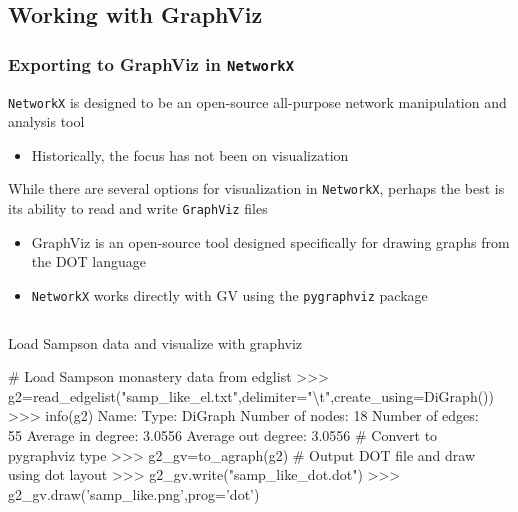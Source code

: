 \documentclass[xcolor=dvipsnames, 9pt]{beamer}
\newenvironment{code}{\begin{semiverbatim} \begin{footnotesize}}
{\end{footnotesize}\end{semiverbatim}}
\begin{document}
\subsection{Working with GraphViz} %
\label{sub:working_with_graphviz}

\begin{frame}[fragile]
    \frametitle{Exporting to GraphViz in \texttt{NetworkX}}
    \texttt{NetworkX} is designed to be an open-source all-purpose network manipulation and analysis tool
    \begin{itemize}
        \item Historically, the focus has not been on visualization
    \end{itemize}
    While there are several options for visualization in \texttt{NetworkX}, perhaps the best is its ability to read and write \texttt{GraphViz} files
    \begin{itemize}
        \item GraphViz is an open-source tool designed specifically for drawing graphs from the DOT language
        \item \texttt{NetworkX} works directly with GV using the \texttt{pygraphviz} package
    \end{itemize}
    \begin{columns}
        \begin{block}{\scriptsize{Load Sampson data and visualize with graphviz}}
            \begin{code}
\tiny{\alert<2>{# Load Sampson monastery data from edglist}
>>> g2=read_edgelist("samp_like_el.txt",delimiter="\textbackslash t",create_using=DiGraph())
>>> info(g2)
Name:                  
Type:                  DiGraph
Number of nodes:       18
Number of edges:       55
Average in degree:     3.0556
Average out degree:    3.0556
\alert<3>{# Convert to pygraphviz type}
>>> g2_gv=to_agraph(g2)
\alert<4>{# Output DOT file and draw using dot layout}
>>> g2_gv.write("samp_like_dot.dot")
>>> g2_gv.draw('samp_like.png',prog='dot')}
            \end{code}
        \end{block}
        \begin{center}
        \end{center}
    \end{columns}
\end{frame}
\end{document}
